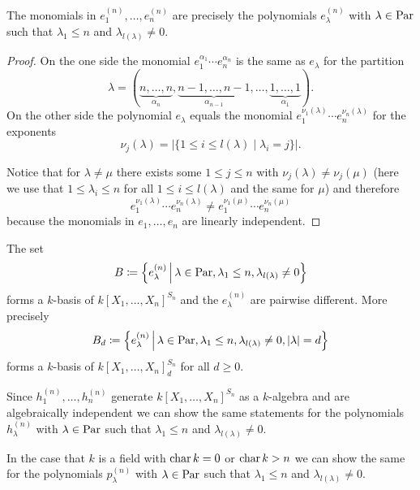 \begin{prop}
  The monomials in $e^{(n)}_1, \dotsc, e^{(n)}_n$ are precisely the polynomials $e^{(n)}_\lambda$ with $\lambda \in \operatorname{Par}$ such that $\lambda_1 \leq n$ and $\lambda_{l(\lambda)} \neq 0$.
\end{prop}
\begin{proof}
  On the one side the monomial $e_1^{\alpha_1} \dotsm e_n^{\alpha_n}$ is the same as $e_\lambda$ for the partition
  \[
      \lambda
    = (
        \underbrace{n, \dotsc, n}_{\alpha_n},
        \underbrace{n-1, \dotsc, n-1}_{\alpha_{n-1}},
        \dotsc,
        \underbrace{1, \dotsc, 1}_{\alpha_1}
      ).
  \]
  On the other side the polynomial $e_\lambda$ equals the monomial $e_1^{\nu_1(\lambda)} \dotsm e_n^{\nu_n(\lambda)}$ for the exponents
  \[
      \nu_j(\lambda)
    = |
        \{
          1 \leq i \leq l(\lambda)
        \mid
          \lambda_i = j
        \}
      |.
  \]
  
  Notice that for $\lambda \neq \mu$ there exists some $1 \leq j \leq n$ with $\nu_j(\lambda) \neq \nu_j(\mu)$ (here we use that $1 \leq \lambda_i \leq n$ for all $1 \leq i \leq l(\lambda)$ and the same for $\mu$) and therefore
  \[
          e_1^{\nu_1(\lambda)} \dotsm e_n^{\nu_n(\lambda)}
    \neq  e_1^{\nu_1(\mu)} \dotsm e_n^{\nu_n(\mu)}
  \]
  because the monomials in $e_1, \dotsc, e_n$ are linearly independent.
\end{proof}


\begin{cor}
  The set
  \[
              B
    \coloneqq \left\{
                e^{(n)}_\lambda
              \,\middle|\,
                \lambda \in \operatorname{Par},
                \lambda_1 \leq n,
                \lambda_{l(\lambda)} \neq 0
              \right\}
  \]
  forms a $k$-basis of $k[X_1, \dotsc, X_n]^{S_n}$ and the $e^{(n)}_\lambda$ are pairwise different.
  More precisely
  \[
              B_d
    \coloneqq \left\{
                e^{(n)}_\lambda
              \,\middle|\,
                \lambda \in \operatorname{Par},
                \lambda_1 \leq n,
                \lambda_{l(\lambda)} \neq 0,
                |\lambda| = d
              \right\}
  \]
  forms a $k$-basis of $k[X_1, \dotsc, X_n]^{S_n}_d$ for all $d \geq 0$.
\end{cor}


\begin{rem}
  Since $h^{(n)}_1, \dotsc, h^{(n)}_n$ generate $k[X_1, \dotsc, X_n]^{S_n}$ as a $k$-algebra and are algebraically independent we can show the same statements for the polynomials $h^{(n)}_\lambda$ with $\lambda \in \operatorname{Par}$ such that $\lambda_1 \leq n$ and $\lambda_{l(\lambda)} \neq 0$.
  
  In the case that $k$ is a field with $\operatorname{char} k = 0$ or $\operatorname{char} k > n$ we can show the same for the polynomials $p^{(n)}_\lambda$ with $\lambda \in \operatorname{Par}$ such that $\lambda_1 \leq n$ and $\lambda_{l(\lambda)} \neq 0$.
\end{rem}


